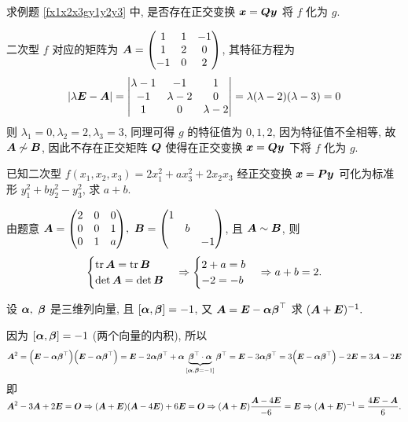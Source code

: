\begin{example}
    求例题 \ref{fx1x2x3gy1y2y3} 中, 是否存在正交变换 $\vb*{x}=\vb*{Q}\vb*{y}$ 将 $f$ 化为 $g.$
\end{example}
\begin{solution}
    二次型 $f$ 对应的矩阵为 $\vb*{A}=\mqty(1&1&-1\\1&2&0\\-1&0&2)$, 其特征方程为 $$|\lambda\vb*{E}-\vb*{A}|=\mqty|\lambda-1&-1&1\\-1&\lambda-2&0\\1&0&\lambda-2|=\lambda(\lambda-2)(\lambda-3)=0$$
    则 $\lambda_1=0,\lambda_2=2,\lambda_3=3$, 同理可得 $g$ 的特征值为 $0,1,2$, 因为特征值不全相等, 故 $\vb*{A}\not\sim \vb*{B}$, 因此不存在正交矩阵 $\vb*{Q}$ 使得在正交变换 $\vb*{x}=\vb*{Q}\vb*{y}$ 下将 $f$ 化为 $g.$
\end{solution}

\begin{example}
    已知二次型 $f(x_1,x_2,x_3)=2x_1^2+ax_3^2+2x_2x_3$ 经正交变换 $\vb*{x}=\vb*{Py}$ 可化为标准形 $y_1^2+by_2^2-y_3^2$, 求 $a+b.$
\end{example}
\begin{solution}
    由题意 $\vb*{A}=\mqty(2&0&0\\0&0&1\\0&1&a),~\vb*{B}=\mqty(\dmat{1,b,-1})$, 且 $\vb*{A}\sim\vb*{B}$, 则
    $$\begin{cases}
            \tr\vb*{A}=\tr\vb*{B}   \\
            \det\vb*{A}=\det\vb*{B} \\
        \end{cases}\Rightarrow\begin{cases}
            2+a=b \\-2=-b
        \end{cases}\Rightarrow a+b=2.$$
\end{solution}

\begin{example}
    设 $\vb*{\alpha},~\vb*{\beta}$ 是三维列向量, 且 $[\vb*{\alpha},\vb*{\beta}]=-1$, 又 $\vb*{A}=\vb*{E}-\vb*{\alpha\beta}^\top$ 求 $(\vb*{A}+\vb*{E})^{-1}.$
\end{example}
\begin{solution}
    因为 $[\vb*{\alpha},\vb*{\beta}]=-1$ (两个向量的内积), 所以
    $$\vb*{A}^2=\qty(\vb*{E}-\vb*{\alpha\beta}^\top)\qty(\vb*{E}-\vb*{\alpha\beta}^\top)=\vb*{E}-2\vb*{\alpha\beta}^\top+\vb*{\alpha}\underbrace{\vb*{\beta}^\top\cdot\vb*{\alpha}}_{[\vb*{\alpha},\vb*{\beta}=-1]}\vb*{\beta}^\top=\vb*{E}-3\vb*{\alpha\beta}^\top=3\qty(\vb*{E}-\vb*{\alpha\beta}^\top)-2\vb*{E}=3\vb*{A}-2\vb*{E}$$
    即 $\vb*{A}^2-3\vb*{A}+2\vb*{E}=\vb*{O}\Rightarrow (\vb*{A}+\vb*{E})(\vb*{A}-4\vb*{E})+6\vb*{E}=\vb*{O}\Rightarrow (\vb*{A}+\vb*{E})\dfrac{\vb*{A}-4\vb*{E}}{-6}=\vb*{E}\Rightarrow (\vb*{A}+\vb*{E})^{-1}=\dfrac{4\vb*{E}-\vb*{A}}{6}.$
\end{solution}

